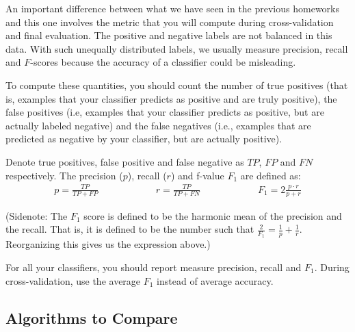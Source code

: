 An important difference between what we have seen in the previous homeworks and
this one involves the metric that you will compute during cross-validation and
final evaluation. The positive and negative labels are not balanced in this
data. With such unequally distributed labels, we usually measure precision,
recall and $F$-scores because the accuracy of a classifier could be misleading.

To compute these quantities, you should count the number of true
positives (that is, examples that your classifier predicts as
positive and are truly positive), the false positives (i.e, examples
that your classifier predicts as positive, but are actually labeled
negative) and the false negatives (i.e., examples that are predicted
as negative by your classifier, but are actually positive).

Denote true positives, false positive and false negative as $TP$, $FP$
and $FN$ respectively. The precision ($p$), recall ($r$) and f-value
$F_1$ are defined as:
\begin{align*}
  p    =  \frac{TP}{TP + FP} \hspace{1in}
  r    =  \frac{TP}{TP+FN}   \hspace{1in}
  F_1  =  2 \frac{p \cdot r}{p + r} 
\end{align*}

(Sidenote: The $F_1$ score is defined to be the harmonic mean of the precision
and the recall. That is, it is defined to be the number such that
$\frac{2}{F_1} = \frac{1}{p} + \frac{1}{r}$. Reorganizing this gives us the
expression above.)

For all your classifiers, you should report measure precision,
recall and $F_1$. During cross-validation, use the average $F_1$
instead of average accuracy.

 

\subsection{Algorithms to Compare}

